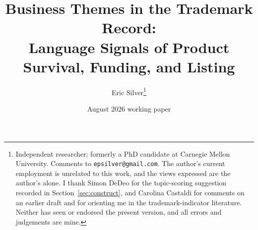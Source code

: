 
\graphicspath{{../}}
\makeatletter{}\makeatother
\title{\bfseries Business Themes in the Trademark Record:\\
\large Language Signals of Product Survival, Funding, and Listing}
\author{Eric Silver\thanks{Independent researcher; formerly a PhD candidate at Carnegie Mellon University. Comments to \texttt{epsilver@gmail.com}. The author's current employment is unrelated to this work, and the views expressed are the author's alone. I thank Simon DeDeo for the topic-scoring suggestion recorded in Section~\ref{sec:construct}, and Carolina Castaldi for comments on an earlier draft and for orienting me in the trademark-indicator literature. Neither has seen or endorsed the present version, and all errors and judgements are mine.}}
\date{August 2026 working paper}


\maketitle











\appendix




